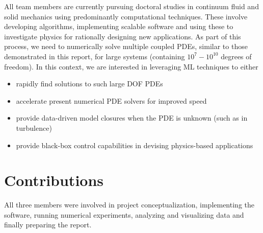 \documentclass[11pt]{article}
\begin{document}
All team members are currently pursuing doctoral studies in continuum fluid
and solid mechanics using predominantly computational techniques. These involve
developing algorithms, implementing scalable software and using these to
investigate physics for rationally designing new applications. As part of this
process, we need to numerically solve multiple coupled PDEs, similar to those
demonstrated in this report, for large systems (containing \(10^7-10^{10}\)
degrees of freedom). In this context, we are interested in leveraging ML techniques to either
\begin{itemize}
\item rapidly find solutions to such large DOF PDEs
\item accelerate present numerical PDE solvers for improved speed
\item provide data-driven model closures when the PDE is unknown (such as in
turbulence)
\item provide black-box control capabilities in devising physics-based applications
\end{itemize}

\section{Contributions}
\label{sec:org1f7ca72}
All three members were involved in project conceptualization, implementing the
software, running numerical experiments, analyzing and visualizing data and finally
preparing the report.


 \newpage




\end{document}
